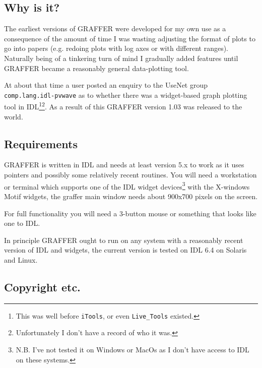 \documentclass[11pt,twoside,english]{article}
\begin{document}
\subsection{Why is it?}

The earliest versions of GRAFFER were developed for my own use as a
consequence of the amount of time I was wasting adjusting the format of
plots to go into papers (e.g. redoing plots with log axes or with
different ranges). Naturally being of a tinkering turn of mind I
gradually added features until GRAFFER became a reasonably general
data-plotting tool.

At about that time a user posted an enquiry to the UseNet group
\texttt{comp.lang.idl-pvwave} as to whether there was a widget-based
graph plotting tool in IDL\footnote{This was well before
  \texttt{iTools}, or even \texttt{Live\_Tools}
  existed.}\footnote{Unfortunately I don't have a record of who it
  was.}. As a result of this GRAFFER version 1.03 was released to the
world.


\subsection{Requirements}

GRAFFER is written in IDL and needs at least version 5.x to work as it
uses pointers and possibly some relatively recent routines. You will
need a workstation or terminal which supports one of the IDL widget
devices\footnote{N.B. I've not tested it on Windows or MacOs as I
  don't have access to IDL on these systems.} with the X-windows Motif
widgets, the graffer main window needs about 900x700 pixels on the
screen.

For full functionality you will need a 3-button mouse or something that
looks like one to IDL.

In principle GRAFFER ought to run on any system with a reasonably
recent version of IDL and widgets, the current version is tested on IDL
6.4 on Solaris and Linux.

\subsection{Copyright etc.}
\end{document}
